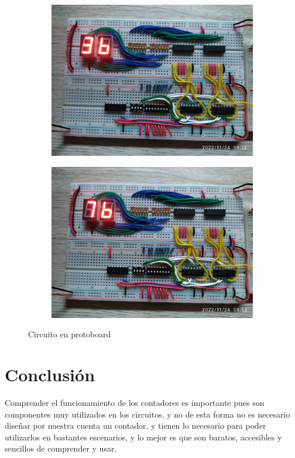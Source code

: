 \documentclass[12pt, oneside]{article}
\begin{document}
\begin{figure}[h!]
\begin{subfigure}{0.45\textwidth}
        \includegraphics[width=\linewidth]{figs/IMG_20221124_081216.jpg}
    \end{subfigure}
    \begin{subfigure}{0.45\textwidth}
        \centering
        \includegraphics[width=\linewidth]{figs/IMG_20221124_081316.jpg}
    \end{subfigure}

    \caption{\sffamily Circuito en protoboard}
    \label{fig:proto}
\end{figure}

\section{Conclusión}
{\sffamily\large
    \hspace{0.5cm} Comprender el funcionamiento de los contadores es importante pues son
    componentes muy utilizados en los circuitos, y no de esta forma no es necesario diseñar por
    nuestra cuenta un contador, y tienen lo necesario para poder utilizarlos en bastantes
    escenarios, y lo mejor es que son baratos, accesibles y sencillos de comprender y usar.

}
\end{document}
